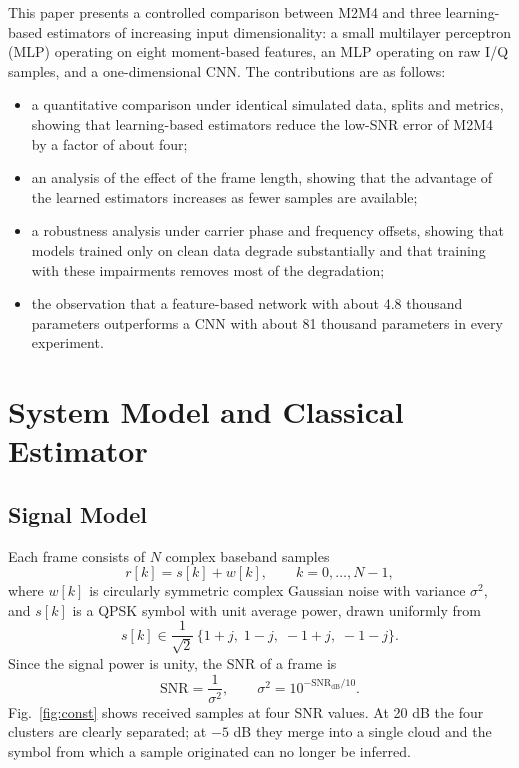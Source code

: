 \documentclass[conference]{IEEEtran}
\begin{document}
This paper presents a controlled comparison between M2M4 and three learning-based estimators of increasing input dimensionality: a small multilayer perceptron (MLP) operating on eight moment-based features, an MLP operating on raw I/Q samples, and a one-dimensional CNN. The contributions are as follows:
\begin{itemize}
\item a quantitative comparison under identical simulated data, splits and metrics, showing that learning-based estimators reduce the low-SNR error of M2M4 by a factor of about four;
\item an analysis of the effect of the frame length, showing that the advantage of the learned estimators increases as fewer samples are available;
\item a robustness analysis under carrier phase and frequency offsets, showing that models trained only on clean data degrade substantially and that training with these impairments removes most of the degradation;
\item the observation that a feature-based network with about 4.8 thousand parameters outperforms a CNN with about 81 thousand parameters in every experiment.
\end{itemize}

\section{System Model and Classical Estimator}

\subsection{Signal Model}

Each frame consists of $N$ complex baseband samples
\begin{equation}
r[k] = s[k] + w[k], \qquad k = 0, \ldots, N-1,
\label{eq:model}
\end{equation}
where $w[k]$ is circularly symmetric complex Gaussian noise with variance $\sigma^2$, and $s[k]$ is a QPSK symbol with unit average power, drawn uniformly from
\begin{equation}
s[k] \in \frac{1}{\sqrt{2}}\,\{1+j,\; 1-j,\; -1+j,\; -1-j\}.
\label{eq:qpsk}
\end{equation} Since the signal power is unity, the SNR of a frame is
\begin{equation}
\mathrm{SNR} = \frac{1}{\sigma^2}, \qquad \sigma^2 = 10^{-\mathrm{SNR_{dB}}/10}.
\label{eq:snr}
\end{equation}
Fig.~\ref{fig:const} shows received samples at four SNR values. At 20 dB the four clusters are clearly separated; at $-5$ dB they merge into a single cloud and the symbol from which a sample originated can no longer be inferred.
\end{document}
